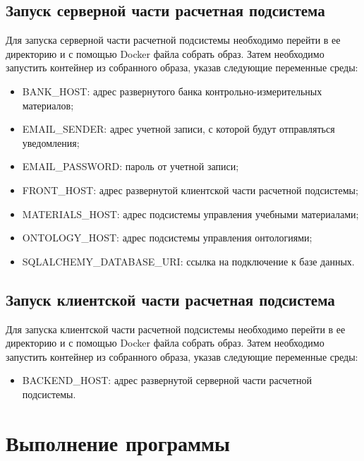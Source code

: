 \documentclass[a4paper,12pt,reqno]{article}
\begin{document}
    \subsection{Запуск серверной части расчетная подсистема}
    Для запуска серверной части расчетной подсистемы необходимо перейти в ее директорию и с помощью Docker файла собрать образ. Затем необходимо запустить контейнер из собранного образа, указав следующие переменные среды:
    \begin{itemize}
        \item BANK\_HOST: адрес развернутого банка контрольно-измерительных материалов;
        \item EMAIL\_SENDER: адрес учетной записи, с которой будут отправляться уведомления;
        \item EMAIL\_PASSWORD: пароль от учетной записи;
        \item FRONT\_HOST: адрес развернутой клиентской части расчетной подсистемы;
        \item MATERIALS\_HOST: адрес подсистемы управления учебными материалами;
        \item ONTOLOGY\_HOST: адрес подсистемы управления онтологиями;
        \item SQLALCHEMY\_DATABASE\_URI: ссылка на подключение к базе данных.
    \end{itemize}

    \subsection{Запуск клиентской части расчетная подсистема}
    Для запуска клиентской части расчетной подсистемы необходимо перейти в ее директорию и с помощью Docker файла собрать образ. Затем необходимо запустить контейнер из собранного образа, указав следующие переменные среды:
    \begin{itemize}
        \item BACKEND\_HOST: адрес развернутой серверной части расчетной подсистемы.
    \end{itemize}


    \section{Выполнение программы}
\end{document}
